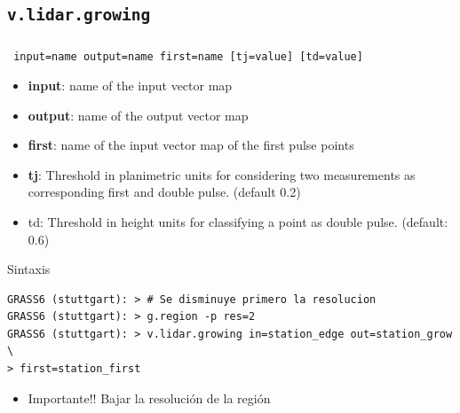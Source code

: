 \subsection{\texttt{v.lidar.growing}}
\begin{frame}[fragile,shrink=10]
  \frametitle{}
  \begin{beamerboxesrounded}[shadow=true]{\textbf{}
    \texttt{ input=name output=name first=name [tj=value] [td=value]}}
    \begin{itemize}
     \item \textbf{input}: name of the input vector map
     \item \textbf{output}: name of the output vector map
     \item \textbf{first}: name of the input vector map of the first pulse points
     \item \textbf{tj}: Threshold in planimetric units for considering two 
         measurements as corresponding first and double pulse. (default 0.2)
     \item td: Threshold in height units for classifying a point as double pulse. 
         (default: 0.6)
    \end{itemize}
  \end{beamerboxesrounded}
  \begin{beamerboxesrounded}[shadow=true]{Sintaxis}
\scriptsize
\begin{verbatim}
GRASS6 (stuttgart): > # Se disminuye primero la resolucion
GRASS6 (stuttgart): > g.region -p res=2
GRASS6 (stuttgart): > v.lidar.growing in=station_edge out=station_grow \
> first=station_first
\end{verbatim}
\end{beamerboxesrounded}
\begin{itemize}
 \item \alert{Importante!!} Bajar la resolución de la región
\end{itemize}
\end{frame}
